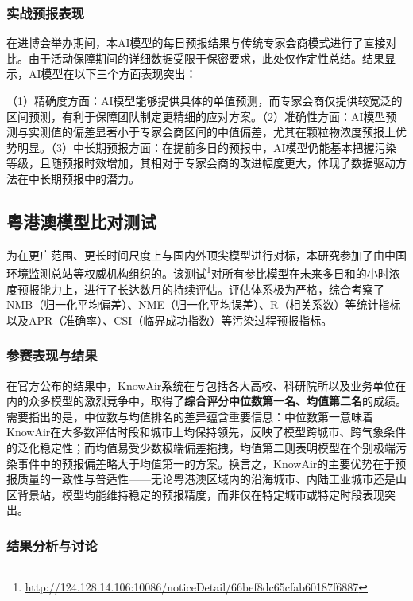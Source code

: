 \subsubsection{实战预报表现}

在进博会举办期间，本AI模型的每日预报结果与传统专家会商模式进行了直接对比。由于活动保障期间的详细数据受限于保密要求，此处仅作定性总结。结果显示，AI模型在以下三个方面表现突出：

（1）精确度方面：AI模型能够提供具体的单值预测，而专家会商仅提供较宽泛的区间预测，有利于保障团队制定更精细的应对方案。（2）准确性方面：AI模型预测与实测值的偏差显著小于专家会商区间的中值偏差，尤其在颗粒物浓度预报上优势明显。（3）中长期预报方面：在提前多日的预报中，AI模型仍能基本把握污染等级，且随预报时效增加，其相对于专家会商的改进幅度更大，体现了数据驱动方法在中长期预报中的潜力。


\subsection{粤港澳模型比对测试}
\label{subsec:gba_case}

为在更广范围、更长时间尺度上与国内外顶尖模型进行对标，本研究参加了由中国环境监测总站等权威机构组织的。该测试\footnote{\url{http://124.128.14.106:10086/noticeDetail/66bef8dc65cfab60187f6887}}对所有参比模型在未来多日\PM 和\ozone 的小时浓度预报能力上，进行了长达数月的持续评估。评估体系极为严格，综合考察了NMB（归一化平均偏差）、NME（归一化平均误差）、R（相关系数）等统计指标以及APR（准确率）、CSI（临界成功指数）等污染过程预报指标\citep{evaluation}。

\subsubsection{参赛表现与结果}

在官方公布的结果中，KnowAir系统在与包括各大高校、科研院所以及业务单位在内的众多模型的激烈竞争中，取得了\textbf{综合评分中位数第一名、均值第二名}的成绩。需要指出的是，中位数与均值排名的差异蕴含重要信息：中位数第一意味着KnowAir在大多数评估时段和城市上均保持领先，反映了模型跨城市、跨气象条件的泛化稳定性；而均值易受少数极端偏差拖拽，均值第二则表明模型在个别极端污染事件中的预报偏差略大于均值第一的方案。换言之，KnowAir的主要优势在于预报质量的一致性与普适性——无论粤港澳区域内的沿海城市、内陆工业城市还是山区背景站，模型均能维持稳定的预报精度，而非仅在特定城市或特定时段表现突出。

\subsubsection{结果分析与讨论}

